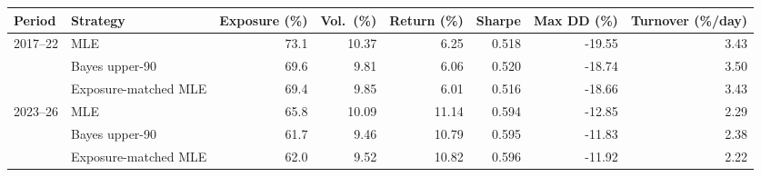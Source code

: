 \begin{tabular}{llrrrrrr}\toprule
Period & Strategy & Exposure (\%) & Vol.\ (\%) & Return (\%) & Sharpe & Max DD (\%) & Turnover (\%/day)\\\midrule
2017--22 & MLE & 73.1 & 10.37 & 6.25 & 0.518 & -19.55 & 3.43 \\
 & Bayes upper-90 & 69.6 & 9.81 & 6.06 & 0.520 & -18.74 & 3.50 \\
 & Exposure-matched MLE & 69.4 & 9.85 & 6.01 & 0.516 & -18.66 & 3.43 \\
\midrule
2023--26 & MLE & 65.8 & 10.09 & 11.14 & 0.594 & -12.85 & 2.29 \\
 & Bayes upper-90 & 61.7 & 9.46 & 10.79 & 0.595 & -11.83 & 2.38 \\
 & Exposure-matched MLE & 62.0 & 9.52 & 10.82 & 0.596 & -11.92 & 2.22 \\
\bottomrule\end{tabular}

